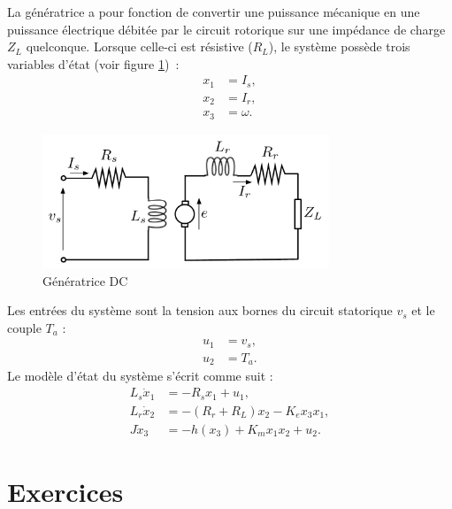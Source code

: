 La génératrice a pour fonction de convertir une puissance mécanique en une puissance électrique débitée par le circuit
rotorique sur une impédance de charge $Z_L$ quelconque. Lorsque celle-ci est
résistive ($R_L$),  le système possède trois variables d'état (voir figure
\ref{fig:genDC})~: 
\begin{equation*} \begin{split} 
x_1 &= I_s, \\ x_2 &= I_r, \\ x_3 &= \omega.
\end{split} \end{equation*}
\begin{figure}[htbp]
\begin{center}
\includegraphics[height=4cm]{genDC}
\caption{Génératrice DC}
\label{fig:genDC}
\end{center}
\end{figure}
Les entrées du système sont la tension aux bornes du circuit statorique
$v_s$ et le couple $T_a$ :
\begin{equation*} \begin{split}
u_1 &= v_s, \\
u_2 &= T_a.
\end{split} \end{equation*}
Le modèle d'état du système s'écrit comme suit :
\begin{equation*} \begin{split}
L_s\dot x_1 &= -R_s x_1+ u_1, \\
L_r\dot x_2 &=  - (R_r +R_L) x_2 - K_e x_3 x_1,\\
J\dot x_3 &= -h(x_3) + K_m x_1x_2 + u_2.
\end{split} \end{equation*}


\section{Exercices}

